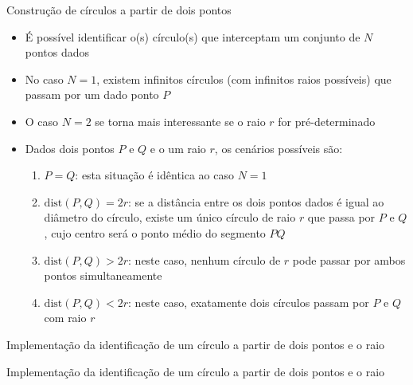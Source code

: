 \begin{frame}[fragile]{Construção de círculos a partir de dois pontos}

    \begin{itemize}
        \item É possível identificar o(s) círculo(s) que interceptam um conjunto de $N$ pontos dados
        \pause
    
        \item No caso $N = 1$, existem infinitos círculos (com infinitos raios possíveis) que 
            passam por um dado ponto $P$
        \pause

        \item O caso $N = 2$ se torna mais interessante se o raio $r$ for pré-determinado
        \pause

        \item Dados dois pontos $P$ e $Q$ e o um raio $r$, os cenários possíveis são:
        \pause

        \begin{enumerate}
            \item $P = Q$: esta situação é idêntica ao caso $N = 1$
        \pause
            \item $\mathrm{dist}(P, Q) = 2r$: se a distância entre os dois pontos dados é igual ao 
                diâmetro do círculo, existe um único círculo de raio $r$ que passa por $P$ e $Q$, 
                    cujo centro será o ponto médio do segmento $PQ$
        \pause
            \item $\mathrm{dist}(P, Q) > 2r$: neste caso, nenhum círculo de $r$ pode passar por 
                ambos pontos simultaneamente
        \pause
            \item $\mathrm{dist}(P, Q) < 2r$: neste caso, exatamente dois círculos passam por $P$ e $Q$ com raio $r$
        \end{enumerate}
    \end{itemize}

\end{frame}

\begin{frame}[fragile]{Implementação da identificação de um círculo a partir de dois pontos e o raio}
\end{frame}

\begin{frame}[fragile]{Implementação da identificação de um círculo a partir de dois pontos e o raio}
\end{frame}

